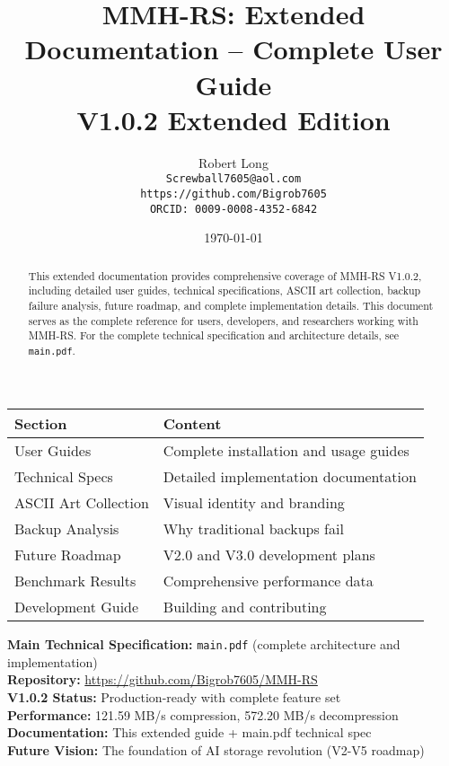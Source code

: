 \documentclass[11pt,a4paper]{article}
\title{MMH-RS: Extended Documentation -- Complete User Guide\\[1ex]\textbf{\large V1.0.2 Extended Edition}}
\author{Robert Long \\ \texttt{Screwball7605@aol.com} \\ \texttt{https://github.com/Bigrob7605} \\ \texttt{ORCID: 0009-0008-4352-6842}}
\date{\today}
\begin{document}
	\maketitle
	\thispagestyle{empty}
	\begin{abstract}
		This extended documentation provides comprehensive coverage of MMH-RS V1.0.2, including detailed user guides, technical specifications, ASCII art collection, backup failure analysis, future roadmap, and complete implementation details. This document serves as the complete reference for users, developers, and researchers working with MMH-RS. For the complete technical specification and architecture details, see \texttt{main.pdf}.
	\end{abstract}

	\begin{center}
	\begin{tcolorbox}[colback=gray!5, colframe=gray!60, boxrule=0.7pt, arc=2pt, title=\textbf{\large MMH-RS Extended Documentation Contents}]
	\begin{tabular}{@{}ll@{}}
	\toprule
	\textbf{Section} & \textbf{Content} \\
	\midrule
	User Guides & Complete installation and usage guides \\
	Technical Specs & Detailed implementation documentation \\
	ASCII Art Collection & Visual identity and branding \\
	Backup Analysis & Why traditional backups fail \\
	Future Roadmap & V2.0 and V3.0 development plans \\
	Benchmark Results & Comprehensive performance data \\
	Development Guide & Building and contributing \\
	\bottomrule
	\end{tabular}
	\end{tcolorbox}
	\end{center}

	\begin{calloutbox}
	\textbf{Main Technical Specification:} \texttt{main.pdf} (complete architecture and implementation) \\
	\textbf{Repository:} \url{https://github.com/Bigrob7605/MMH-RS} \\
	\textbf{V1.0.2 Status:} Production-ready with complete feature set \\
	\textbf{Performance:} 121.59 MB/s compression, 572.20 MB/s decompression \\
	\textbf{Documentation:} This extended guide + main.pdf technical spec \\
	\textbf{Future Vision:} The foundation of AI storage revolution (V2-V5 roadmap)
	\end{calloutbox}
	
\end{document}
